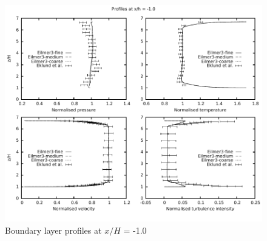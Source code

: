 \begin{figure}[h]
 \begin{center}
  \includegraphics[width=15cm]{./chap4-backward-facing-step/figs/xh_-10.pdf}
 \end{center}
 \caption{Boundary layer profiles at $x/H$ = -1.0}
 \label{backward-facing-step-xH--10}
\end{figure}
%

